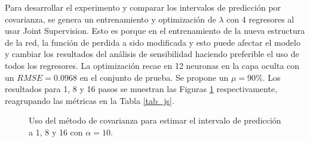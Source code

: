 \documentclass[12pt]{article}
\begin{document}
Para desarrollar el experimento y comparar los intervalos de predicción por covarianza, se genera un entrenamiento y optimización de $\lambda$ con 4 regresores al usar Joint Supervision. Esto es porque en el entrenamiento de la nueva estructura de la red, la función de perdida a sido modificada y esto puede afectar el modelo y cambiar los resultados del análisis de sensibilidad haciendo preferible el uso de todos los regresores. La optimización recae en 12 neuronas en la capa oculta con un $RMSE = 0.0968$ en el conjunto de prueba. Se propone un $\mu=90\%$. Los resultados para 1, 8 y 16 pasos se muestran las Figuras \ref{js_4} respectivamente, reagrupando las métricas en la Tabla \ref{tab_js}. 

\begin{figure}[h!]
	\centering
	\captionsetup{justification=centering}
	 \newline
	\caption{Uso del método de covarianza para estimar el intervalo de predicción a 1, 8 y 16 con $\alpha=10$.}
	\label{js_4}
\end{figure}
\end{document}
